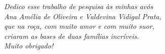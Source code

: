\begin{dedicatoria}
   \vspace*{\fill}
   \centering
   \noindent
   \textit{Dedico esse trabalho de pesquisa às minhas avós}       \\
   \textit{Ana Amélia de Oliveira e Valdevina Vidigal Prata,}     \\
   \textit{que na roça, com muito amor e com muito suor,}         \\
   \textit{criaram as bases de duas famílias incríveis.}          \\
   \textit{Muito obrigado!}
   \vspace*{\fill}
\end{dedicatoria}